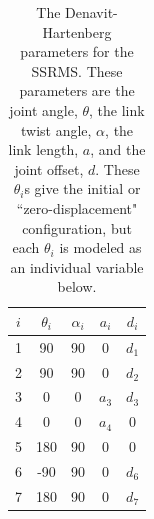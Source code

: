\documentclass{article}
\begin{document}
\begin{table}[h]
\centering
\begin{tabular}{c|*{4}{c}}
\toprule
$i$ & $\theta_i$ & $\alpha_i$ & $a_i$ & $d_i$ \\
\midrule
1 &  90 & 90 &     0 & $d_1$ \\
2 &  90 & 90 &     0 & $d_2$ \\
3 &   0 &  0 & $a_3$ & $d_3$ \\
4 &   0 &  0 & $a_4$ &     0 \\
5 & 180 & 90 &     0 &     0 \\
6 & -90 & 90 &     0 & $d_6$ \\
7 & 180 & 90 &     0 & $d_7$ \\
\bottomrule
\end{tabular}
\caption{The Denavit-Hartenberg parameters for the SSRMS. These parameters are the joint angle, $\theta$, the link twist angle, $\alpha$, the link length, $a$, and the joint offset, $d$. These $\theta_i$s give the initial or ``zero-displacement" configuration, but each $\theta_i$ is modeled as an individual variable below.}
\label{dhparams}
\end{table}
\end{document}
